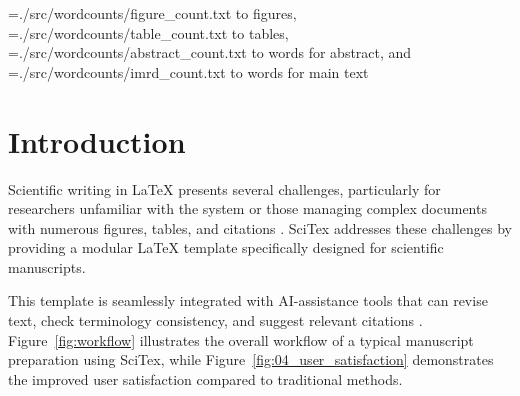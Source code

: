 \documentclass[preprint,review,12pt]{elsarticle}%
\newcommand\readwordcount[1]{%
  \openin\wordcount=#1
  \read\wordcount to \thewordcount
  \closein\wordcount
  \thewordcount
}
\begin{document}
\begin{frontmatter}

\begin{wordcount}
\readwordcount{./src/wordcounts/figure_count.txt} figures, \readwordcount{./src/wordcounts/table_count.txt} tables, \readwordcount{./src/wordcounts/abstract_count.txt} words for abstract, and \readwordcount{./src/wordcounts/imrd_count.txt} words for main text
\end{wordcount}



\section{Introduction}
\label{sec:introduction}

Scientific writing in LaTeX presents several challenges, particularly for researchers unfamiliar with the system or those managing complex documents with numerous figures, tables, and citations \cite{Smith2020}. SciTex addresses these challenges by providing a modular LaTeX template specifically designed for scientific manuscripts. 

This template is seamlessly integrated with AI-assistance tools that can revise text, check terminology consistency, and suggest relevant citations \cite{Johnson2023}. Figure~\ref{fig:workflow} illustrates the overall workflow of a typical manuscript preparation using SciTex, while Figure~\ref{fig:04_user_satisfaction} demonstrates the improved user satisfaction compared to traditional methods.



\end{frontmatter}
\end{document}
